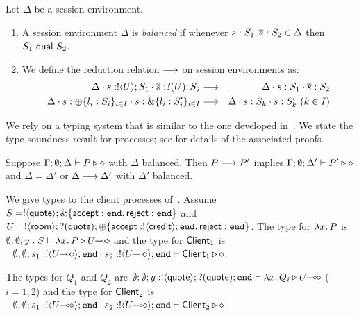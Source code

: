 
\begin{definition}\label{d:wtenvred}%
	Let $\Delta$ be a session environment.
	\begin{enumerate}[$\bullet$]
	\item A session environment $\Delta$ is {\em balanced} if whenever
	$s: S_1, \overline{s}: S_2 \in \Delta$ then $S_1 \ \mathsf{dual}\  S_2$.
	\item We define the reduction relation $\longrightarrow$ on session environments as: %
\begin{eqnarray*}
	\Delta \cat s: \btout{U} S_1 \cat \dual{s}: \btinp{U} S_2  & \red & 
	\Delta \cat s: S_1 \cat \dual{s}: S_2  \\
	\Delta \cat s: \btsel{l_i: S_i}_{i \in I} \cat \dual{s}: \btbra{l_i: S_i'}_{i \in I} &\red& \Delta \cat s: S_k \cat \dual{s}: S_k' \ (k \in I)
\end{eqnarray*}
\end{enumerate}
\end{definition}

\noi We rely on a typing system that is similar to the one developed in~\cite{tlca07,MostrousY15}. 
We state the type soundness result for \HOp processes;
see  for details of the associated proofs.


\begin{theorem}\label{t:sr}%
			Suppose $\Gamma; \emptyset; \Delta \vdash P \triangleright \diamond$
			with
			$\Delta$ balanced. 
			Then $P \longrightarrow P'$ implies $\Gamma; \emptyset; \Delta'  \vdash P' \triangleright \diamond$
			and $\Delta = \Delta'$ or $\Delta \longrightarrow \Delta'$
			with $\Delta'$ balanced. 
\end{theorem}


\begin{example}\label{exam:type}
We give types to the client
processes of~.
Assume $S = ! \langle \mathsf{quote} \rangle ; \& \{\mathsf{accept}: \mathtt{end}, \mathsf{reject}: \mathtt{end}\}$ and
$U = ! \langle \mathsf{room} \rangle ; ? (\mathsf{quote}) ; \oplus \{\mathsf{accept}: ! \langle \mathsf{credit} \rangle ; \mathtt{end}, \mathsf{reject}: \mathtt{end} \}$.
The type for $\lambda x.\,P$ is $\emptyset; \emptyset; y: S \vdash \lambda x.\,P \triangleright U\!\! \multimap\!\! \diamond$
and the type for $\mathsf{Client}_1$ is
$~~
	\es; \es; s_1: \btout{\lhot{U}} \tinact \cat s_2: \btout{\lhot{U}} \tinact \proves \Client_1 \hastype \Proc
$.


The types for $Q_1$ and $Q_2$ are
$	\emptyset; \emptyset; y: ! \langle \mathsf{quote} \rangle ; ? (\mathsf{quote}) ; \mathtt{end} \vdash \lambda x.\,Q_i \triangleright U\!\! \multimap\!\! \diamond
$ ($i=1,2$)
and the type for $\mathsf{Client}_2$ is
$~~
	\es; \es; s_1: \btout{\lhot{U}} \tinact \cat s_2: \btout{\lhot{U}} \tinact \proves \Client_2 \hastype \Proc
$.
\end{example}

